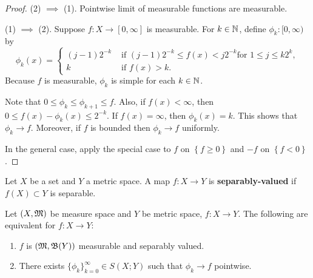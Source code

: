 \documentclass[a4paper]{article}
\renewcommand{\seqinfk}[1]{\{ #1 \}_{k=0}^\infty}
\begin{document}
\begin{proof}
  (2) $\implies$ (1). Pointwise limit of measurable
  functions are measurable.

  (1) $\implies$ (2). Suppose $f : X \to [0, \infty]$
  is measurable. For $k \in \mathbb{N}$, define
  $\phi_k : [0, \infty)$ by
  \[
    \phi_k(x) = \begin{cases}
    (j - 1)2^{-k} & \text{ if
  $(j - 1)2^{-k} \leq f(x) < j 2^{-k}$
    for $1 \leq j \leq k 2^k$}, \\
    k & \text{ if $f(x) > k$}.
    \end{cases}
  \]
  Because $f$ is measurable, $\phi_k$ is simple for each $k \in \mathbb{N}$.

  Note that $0 \leq \phi_k \leq \phi_{k+1} \leq f$. Also, if $f(x) <
  \infty$, then $0 \leq f(x) - \phi_k(x) \leq 2^{-k}$. If $f(x) = \infty$,
  then $\phi_k(x) = k$. This shows that $\phi_k \to f$. Moreover, if $f$
  is bounded then $\phi_k \to f$ uniformly.

  In the general case, apply the special case to $f$ on $\left\{ f \geq 0
  \right\}$ and $-f$ on $\left\{ f < 0 \right\}$.

\end{proof}

\begin{defi}
  Let $X$ be a set and $Y$ a metric space. A map $f: X
    \to Y$ is \textbf{separably-valued}
  if $f(X) \subset Y$ is separable.
\end{defi}

\begin{thm}
  Let $(X, \mathfrak{M})$ be measure space and $Y$ be metric space, $f : X \to Y$.
  The following are equivalent for $f: X \to Y$:
  \begin{enumerate}
    \item $f$ is $(\mathfrak{M}, \mathfrak{B}(Y))$ measurable and
          separably valued.
    \item There exists $\seqinfk{\phi_k} \in S(X; Y)$ such that $\phi_k
          \to f$ pointwise.
  \end{enumerate}
\end{thm}
\end{document}
